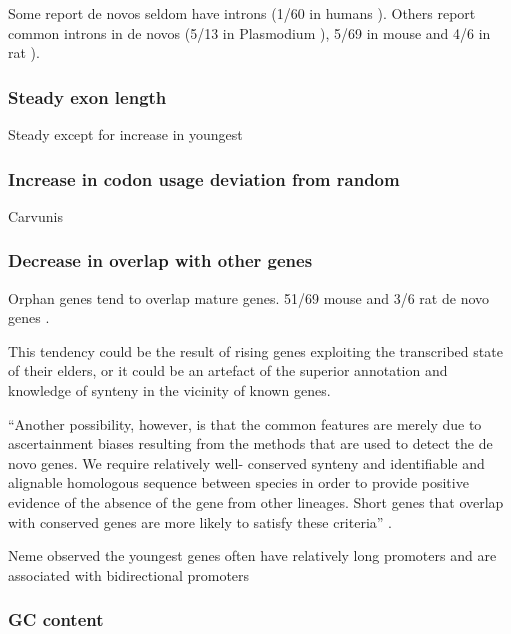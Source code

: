     Some report de novos seldom have introns (1/{60} in humans
    \cite{wu_novo_2011}). Others report common introns in de novos (5/{13}
    in Plasmodium \cite{yang_novo_2011}), 5/{69} in mouse and 4/{6} in rat
    \cite{murphy_novo_2012}).


  \subsubsection{Steady exon length}

    Steady except for increase in youngest
    \cite{neme_phylogenetic_2013}

  \subsubsection{Increase in codon usage deviation from random}

    Carvunis \cite{carvunis_proto-genes_2012}

  \subsubsection{Decrease in overlap with other genes}

    Orphan genes tend to overlap mature genes. 51/69 mouse and 3/6 rat
    de novo genes \cite{murphy_novo_2012}.

    This tendency could be the result of rising genes exploiting the
    transcribed state of their elders, or it could be an artefact of
    the superior annotation and knowledge of synteny in the vicinity of
    known genes.

    ``Another possibility, however, is that the common features are
    merely due to ascertainment biases resulting from the methods that
    are used to detect the de novo genes. We require relatively well-
    conserved synteny and identifiable and alignable homologous
    sequence between species in order to provide positive evidence of
    the absence of the gene from other lineages. Short genes that
    overlap with conserved genes are more likely to satisfy these
    criteria'' \cite[pp. 8]{murphy_novo_2012}.

    Neme observed the youngest genes often have relatively long
    promoters and are associated with bidirectional promoters
    \cite{neme_phylogenetic_2013}

  \subsubsection{GC content}

